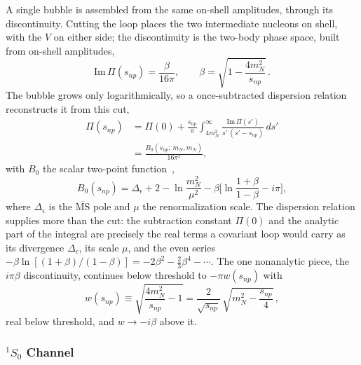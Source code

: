 \documentclass[
  aps,prd,twocolumn,nofootinbib,superscriptaddress,
  longbibliography,floatfix,preprintnumbers
]{revtex4-2}
\begin{document}
A single bubble is assembled from the same on-shell amplitudes, through its
discontinuity. Cutting the loop places the two intermediate nucleons on shell,
with the $V$ on either side; the
discontinuity is the two-body phase space, built from on-shell amplitudes,
\begin{equation}
  \mathrm{Im}\,\Pi(s_{np}) = \frac{\beta}{16\pi},
  \qquad \beta = \sqrt{1 - \frac{4m_N^{2}}{s_{np}}}\,.
  \label{eq:ImPi}
\end{equation}
The bubble grows only logarithmically, so a once-subtracted dispersion relation
reconstructs it from this cut,
\begin{equation}
\begin{split}
  \Pi(s_{np}) &= \Pi(0) + \frac{s_{np}}{\pi}
     \int_{4m_N^{2}}^{\infty}\!\frac{\mathrm{Im}\,\Pi(s')}{s'\,(s'-s_{np})}\,ds'\\
   &= \frac{B_0(s_{np};\,m_N,m_N)}{16\pi^{2}},
\end{split}
  \label{eq:PiB0}
\end{equation}
with $B_0$ the scalar two-point function~\cite{tHooft:1978xw},
\begin{equation}
  B_0(s_{np}) = \Delta_\epsilon + 2 - \ln\frac{m_N^{2}}{\mu^{2}}
   - \beta\Big[\ln\frac{1+\beta}{1-\beta} - i\pi\Big],
  \label{eq:B0}
\end{equation}
where $\Delta_\epsilon$ is the $\overline{\mathrm{MS}}$ pole and $\mu$ the renormalization scale. The
dispersion relation supplies more than the cut: the subtraction constant
$\Pi(0)$ and the analytic part of the integral are precisely the real terms a
covariant loop would carry as its divergence $\Delta_\epsilon$, its scale $\mu$,
and the even series $-\beta\ln[(1+\beta)/(1-\beta)] = -2\beta^{2} -
\tfrac23\beta^{4} - \cdots$.  The one nonanalytic piece, the $i\pi\beta$
discontinuity, continues below threshold to $-\pi w(s_{np})$ with
\begin{equation}
  w(s_{np}) \equiv \sqrt{\frac{4m_N^{2}}{s_{np}} - 1}
   = \frac{2}{\sqrt{s_{np}}}\,\sqrt{m_N^{2} - \frac{s_{np}}{4}}\,,
  \label{eq:wdef}
\end{equation}
real below threshold, and $w \to -i\beta$ above it.

\subsubsection{${}^{1}S_0$ Channel}
\end{document}
